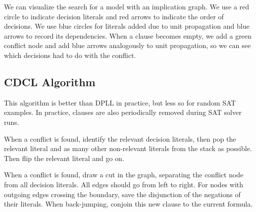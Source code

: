 \begin{mytitle} We can visualize the search for a model with an implication graph. We use a red circle to indicate decision literals and red arrows to indicate the order of decisions. We use blue circles for literals added due to unit propagation and blue arrows to record its dependencies. When a clause becomes empty, we add a green conflict node and add blue arrows analogously to unit propagation, so we can see which decisions had to do with the conflict.
\end{mytitle}

\subsection{CDCL Algorithm}
\begin{mytitle} This algorithm is better than DPLL in practice, but less so for random SAT examples. In practice, clauses are also periodically removed during SAT solver runs.
    \begin{mysubtitle} When a conflict is found, identify the relevant decision literals, then pop the relevant literal and as many other non-relevant literals from the stack as possible. Then flip the relevant literal and go on.
    \end{mysubtitle}
    \begin{mysubtitle} When a conflict is found, draw a cut in the graph, separating the conflict node from all decision literals. All edges should go from left to right. For nodes with outgoing edges crossing the boundary, save the disjunction of the negations of their literals. When back-jumping, conjoin this new clause to the current formula.
    \end{mysubtitle}
\end{mytitle}






